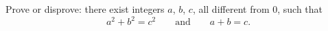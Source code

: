 Prove or disprove: there exist integers $a$, $b$, $c$, all different from $0$, such that
\[a^2+b^2=c^2\qquad\text{and}\qquad a+b=c .\]

